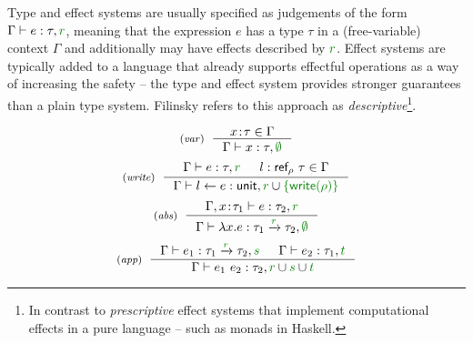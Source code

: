 Type and effect systems are usually specified as judgements of the form $\Gamma \vdash e : \tau, \cclrd{r}$, 
meaning that the expression $e$ has a type $\tau$ in a (free-variable) context $\Gamma$ and 
additionally may have effects described by $\cclrd{r}$. Effect systems are typically added to a 
language that already supports effectful operations as a way of increasing the safety -- the type 
and effect system provides stronger guarantees than a plain type system. Filinsky 
\cite{effects-comprehensive} refers to this approach as \emph{descriptive}\footnote{In contrast 
to \emph{prescriptive} effect systems that implement computational effects in a pure language 
-- such as monads in Haskell.}.


\begin{figure}[t]
\begin{equation*}
\tyrule{var}
  {x\!:\!\tau \in \Gamma }
  {\Gamma \vdash x : \tau, \cclrd{\emptyset} }
\end{equation*}
\begin{equation*}
\tyrule{write}
  {\Gamma \vdash e : \tau, \cclrd{r} & l:\ident{ref}_\rho~\tau\in \Gamma}
  {\Gamma \vdash l \leftarrow e : \ident{unit}, \cclrd{r} \cup \cclrd{\{\ident{write}(\rho)\}} }
\end{equation*}
\begin{equation*}
\tyrule{abs}
  {\Gamma, x\!:\!\tau_1 \vdash e : \tau_2, \cclrd{r} }
  {\Gamma \vdash \lambda x.e : \tau_1 \xrightarrow{\cclrd{r}} \tau_2, \cclrd{\emptyset} }
\end{equation*}
\begin{equation*}
\tyrule{app}
  {\Gamma \vdash e_1 : \tau_1 \xrightarrow{\cclrd{r}} \tau_2, \cclrd{s} &
   \Gamma \vdash e_2 : \tau_1, \cclrd{t} }
  {\Gamma \vdash e_1~e_2 : \tau_2, \cclrd{r} \cup \cclrd{s} \cup \cclrd{t} }
\end{equation*}

\label{fig:path-eff}
\end{figure}


